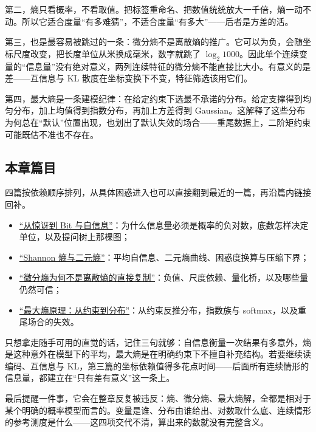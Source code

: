 第二，熵只看概率，不看取值。把标签重命名、把数值统统放大一千倍，熵一动不动。所以它适合度量``有多难猜''，不适合度量``有多大''——后者是方差的活。

第三，也是最容易被跳过的一条：微分熵不是离散熵的推广。它可以为负，会随坐标尺度改变，把长度单位从米换成毫米，数字就跳了 \(\log_2 1000\)。因此单个连续变量的``信息量''没有绝对意义，两列连续特征的微分熵不能直接比大小。有意义的是差——互信息与 KL 散度在坐标变换下不变，特征筛选该用它们。

第四，最大熵是一条建模纪律：在给定约束下选最不承诺的分布。给定支撑得到均匀分布，加上均值得到指数分布，再加上方差得到 Gaussian。这解释了这些分布为何总在``默认''位置出现，也划出了默认失效的场合——重尾数据上，二阶矩约束可能既估不准也不存在。

\subsection{本章篇目}

四篇按依赖顺序排列，从具体困惑进入也可以直接翻到最近的一篇，再沿篇内链接回补。

\begin{itemize}
\tightlist
\item \hyperref[sec:07-Information-Theory/01-Information-and-Entropy/01]{``从惊讶到 Bit 与自信息''}：为什么信息量必须是概率的负对数，底数怎样决定单位，以及提问树上那棵图；
\item \hyperref[sec:07-Information-Theory/01-Information-and-Entropy/02]{``Shannon 熵与二元熵''}：平均自信息、二元熵曲线、困惑度换算与压缩下界；
\item \hyperref[sec:07-Information-Theory/01-Information-and-Entropy/03]{``微分熵为何不是离散熵的直接复制''}：负值、尺度依赖、量化桥，以及哪些量仍然可信；
\item \hyperref[sec:07-Information-Theory/01-Information-and-Entropy/04]{``最大熵原理：从约束到分布''}：从约束反推分布，指数族与 softmax，以及重尾场合的失效。
\end{itemize}

只想拿走随手可用的直觉的话，记住三句就够：自信息衡量一次结果有多意外，熵是这种意外在模型下的平均，最大熵是在明确约束下不擅自补充结构。若要继续读编码、互信息与 KL，第三篇的坐标依赖值得多花点时间——后面所有连续情形的信息量，都建立在``只有差有意义''这一条上。

最后提醒一件事，它会在整章反复被违反：熵、微分熵、最大熵解，全都是相对于某个明确的概率模型而言的。变量是谁、分布由谁给出、对数取什么底、连续情形的参考测度是什么——这四项交代不清，算出来的数就没有完整含义。
